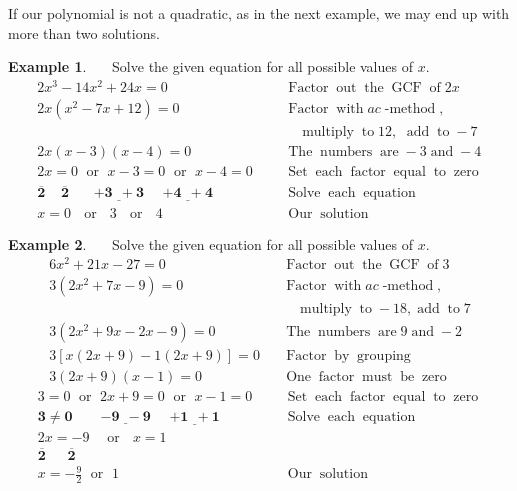 \documentclass[12pt]{book}
\theoremstyle{definition}
\newtheorem{example}{Example}
\newcommand{\tmmathbf}[1]{\ensuremath{\boldsymbol{#1}}}
\newcommand{\tmop}[1]{\ensuremath{\operatorname{#1}}}
\begin{document}
If our polynomial is not a quadratic, as in the next example, we may end up with more than two solutions.
\begin{example}~~~Solve the given equation for all possible values of $x$.
  \begin{eqnarray*}
    2 x^3 - 14 x^2 + 24 x = 0~~~ &  & \tmop{Factor} \tmop{out} \tmop{the}
    \tmop{GCF} \tmop{of} 2 x\\
    2 x (x^2 - 7 x + 12) = 0~~~ &  & \tmop{Factor} \tmop{with} ac
    \tmop{-method},\\
		&& \tmop{~~~multiply} \tmop{to} 12, \tmop{~add} \tmop{to} - 7\\
    2 x (x - 3) (x - 4) = 0~~~ &  & \tmop{The} \tmop{numbers} \tmop{are} - 3
    \tmop{and} - 4\\
    2 x = 0 \tmop{~or~} x - 3 = 0 \tmop{~or~} x - 4 = 0~~~ &  & \tmop{Set}
    \tmop{each} \tmop{factor} \tmop{equal} \tmop{to} \tmop{zero}\\
    \tmmathbf{\overline{2} ~~~~~ \overline{2} ~~~~~~~~ \underline{+ 3 ~~+ 3} ~~~~~~ \underline{+ 4 ~~+ 4}} &  &
    \tmop{Solve} \tmop{each} \tmop{equation}\\
    x = 0 \tmop{~~or~~} 3 \tmop{~~or~~} 4~~~~~~~ &  & \tmop{Our} \tmop{solution}
  \end{eqnarray*}
\end{example}
\begin{example}~~~Solve the given equation for all possible values of $x$.
  \begin{eqnarray*}
    6 x^2 + 21 x - 27 = 0 &  & \tmop{Factor} \tmop{out} \tmop{the} \tmop{GCF}
    \tmop{of} 3\\
    3 (2 x^2 + 7 x - 9) = 0 &  & \tmop{Factor} \tmop{with} ac
    \tmop{-method},\\
		&&\tmop{~~~multiply} \tmop{to} - 18, \tmop{add} \tmop{to} 7\\
    3 (2 x^2 + 9 x - 2 x - 9) = 0 &  & \tmop{The} \tmop{numbers} \tmop{are} 9
    \tmop{and} - 2\\
    3 [x (2 x + 9) - 1 (2 x + 9)] = 0 &  & \tmop{Factor} \tmop{by}
    \tmop{grouping}\\
    3 (2 x + 9) (x - 1) = 0 &  & \tmop{One} \tmop{factor} \tmop{must}
    \tmop{be} \tmop{zero}
  \end{eqnarray*}
	\begin{eqnarray*}
		3 = 0 \tmop{~or~} 2 x + 9 = 0 \tmop{~or~} x - 1 = 0~~~ &  & \tmop{Set}
    \tmop{each} \tmop{factor} \tmop{equal} \tmop{to} \tmop{zero}\\
    \tmmathbf{3 \neq 0 ~~~~~~~~~\underline{- 9 ~~- 9} ~~~~~~ \underline{+ 1 ~~+ 1}} &  & \tmop{Solve}
    \tmop{each} \tmop{equation}\\
    2 x = - 9 \tmop{~~~or~~} x = 1~~~ &  & \\
    \tmmathbf{\overline{2} ~~~~~~~ \overline{2}}~~~~~~~~~~~~~~~~~~~  &  & \\
    x = - \frac{9}{2} \tmop{~or~} 1~~~~~ &  & \tmop{Our} \tmop{solution}
  \end{eqnarray*}
\end{example}
\end{document}
